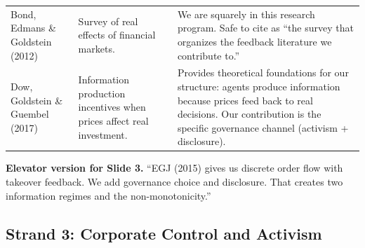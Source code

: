 \documentclass[9pt,a4paper]{extarticle}
\begin{document}
{\begin{longtable}{@{}P{0.20\textwidth}P{0.32\textwidth}P{0.42\textwidth}@{}}
Bond, Edmans \& Goldstein (2012) &
Survey of real effects of financial markets. &
We are squarely in this research program. Safe to cite as ``the survey that organizes the feedback literature we contribute to.'' \\

Dow, Goldstein \& Guembel (2017) &
Information production incentives when prices affect real investment. &
Provides theoretical foundations for our structure: agents produce information because prices feed back to real decisions. Our contribution is the specific governance channel (activism + disclosure). \\
\bottomrule
\end{longtable}
}

\textbf{Elevator version for Slide 3.} ``EGJ (2015) gives us discrete order flow with takeover feedback. We add governance choice and disclosure. That creates two information regimes and the non-monotonicity.''

\subsection{Strand 3: Corporate Control and Activism}
\end{document}
